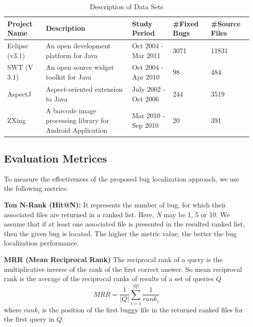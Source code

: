 \documentclass[conference]{IEEEtran}
\begin{document}
\begin{table}[htbp]
	\caption{Description of Data Sets}
	\label{tab:DDSl}
	\begin{center}
		\begin{tabular}{ p{1cm} | p{2.5cm} | p{1.5cm} | p{.75cm} | p{.75cm} }
			\hline
			\textbf{Project Name}  & \textbf{Description} & \textbf{Study Period}& \textbf{\#Fixed Bugs} & \textbf{\#Source Files}\\
			\hline
		 \hline
				
			{Eclipse (v3.1)} & An open development platform for Java & Oct 2004 - Mar 2011 & {3071} & 11831\\ \hline
			SWT (V 3.1)& An open source widget toolkit for Java & Oct 2004 - Apr 2010 & 98 &  484\\ \hline
			AspectJ& Aspect-oriented extension to Java & July 2002 - Oct 2006 & 244 & 3519 \\ \hline
			ZXing & A barcode image processing library for Android Application & Mar 2010 - Sep 2010 & 20 & 391 \\
			\hline
			
		\end{tabular}
	\end{center}
\end{table}
\subsection{Evaluation Metrices}
To measure the effectiveness of the proposed bug localization approach, we use the following metrics:

\textbf{Ton N-Rank (Hit@N):} It represents the number of bug, for which their associated files are returned in a ranked list. Here, \textit{N} may be 1, 5 or 10. We assume that if at least one associated file is presented in the resulted ranked list, then the given bug is located. The higher the metric value, the better the bug localization performance.

\textbf{MRR (Mean Reciprocal Rank)}
The reciprocal rank of a query is the multiplicative inverse of the rank of the first correct answer. So mean reciprocal rank is the average of the reciprocal ranks of results of a set of queries $Q$
\begin{equation}
MRR=\frac{1}{\left | Q \right |}\sum_{i=1}^{\left | Q \right |}\frac{1}{rank_{i}}
\end{equation}
where $rank_i$ is the position of the first buggy file in the returned ranked files for the first query in $Q$.
\end{document}
